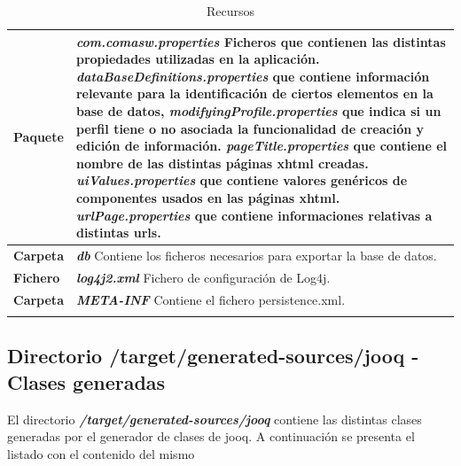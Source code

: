 \begin{longtable}{m{3cm} m{12cm}}
    \caption{Recursos}
    \label{tab:recursos}\\  	
    \rowcolors{2}{white}{white}
    \textbf{Paquete} & \textit{\textbf{com.comasw.properties}} \newline
    Ficheros que contienen las distintas propiedades utilizadas en la aplicación.\newline
    \textit{dataBaseDefinitions.properties} que contiene información relevante para la identificación de ciertos elementos en la base de datos,
\textit{modifyingProfile.properties} que indica si un perfil tiene o no asociada la funcionalidad de creación y edición de información.
\textit{pageTitle.properties} que contiene el nombre de las distintas páginas \acrshort{xhtml} creadas.
\textit{uiValues.properties} que contiene valores genéricos de componentes usados en las páginas \acrshort{xhtml}.
\textit{urlPage.properties} que contiene informaciones relativas a distintas urls.
\\\hline
	\textbf{Carpeta} & \textit{\textbf{db}} \newline
    Contiene los ficheros necesarios para exportar la base de datos.
	\\\hline
	\textbf{Fichero} & \textit{\textbf{log4j2.xml}} \newline
    Fichero de configuración de Log4j.
	\\\hline
	\textbf{Carpeta} & \textit{\textbf{META-INF}} \newline
    Contiene el fichero persistence.xml.
	\\\hline
\\\hline

\end{longtable}    



\subsection{Directorio /target/generated-sources/jooq - Clases generadas}
\label{sub:recursos}
El directorio \textit{\textbf{/target/generated-sources/jooq}} contiene las distintas clases generadas por el generador de clases de \acrshort{jooq}. A continuación se presenta el listado con el contenido del mismo



